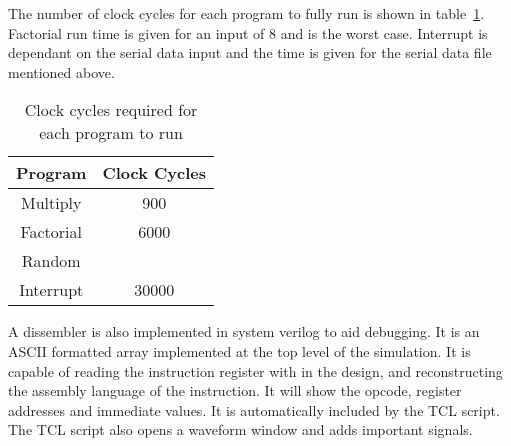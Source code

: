

The number of clock cycles for each program to fully run is shown in table~\ref{tab:runtimes}. 
Factorial run time is given for an input of 8 and is the worst case. 
Interrupt is dependant on the serial data input and the time is given for the serial data file mentioned above.

\begin{table}
\centering
\caption{Clock cycles required for each program to run}
\label{tab:runtimes}
\begin{tabular}{|c|c|}
Program & Clock Cycles \\ \hline
Multiply	& 900	\\
Factorial	& 6000	\\
Random		& 	\\
Interrupt	& 30000	\\ \hline
\end{tabular}
\end{table}

A dissembler is also implemented in system verilog to aid debugging.
It is an ASCII formatted array implemented at the top level of the simulation. 
It is capable of reading the instruction register with in the design, and reconstructing the assembly language of the instruction. 
It will show the opcode, register addresses and immediate values.
It is automatically included by the TCL script.
The TCL script also opens a waveform window and adds important signals.


